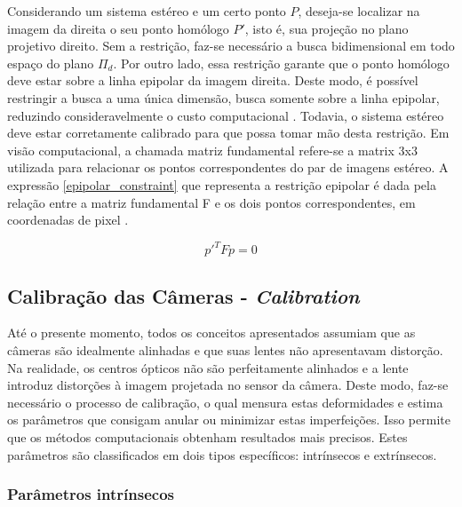 Considerando um sistema estéreo e um certo ponto $P$, deseja-se localizar na imagem da direita o seu ponto homólogo $P'$, isto é, sua projeção no plano projetivo direito. Sem a restrição, faz-se necessário a busca bidimensional em todo espaço do plano $\Pi_d$. Por outro lado, essa restrição garante que o ponto homólogo deve estar sobre a linha epipolar da imagem direita. Deste modo, é possível restringir a busca a uma única dimensão, busca somente sobre a linha epipolar, reduzindo consideravelmente o custo computacional \cite{Bradski2008}. Todavia, o sistema estéreo deve estar corretamente calibrado para que possa tomar mão desta restrição. Em visão computacional, a chamada matriz fundamental refere-se a matrix 3x3 utilizada para relacionar os pontos correspondentes do par de imagens estéreo. A expressão \ref{epipolar_constraint} que representa a restrição epipolar é dada pela relação entre a matriz fundamental F e os dois pontos correspondentes, em coordenadas de pixel \cite{RobertLaganiere}.

\begin{equation}
 \label{epipolar_constraint}
 p'^TFp = 0
\end{equation}


\subsection{Calibração das Câmeras - \textit{Calibration}}
\label{theory_calib}

Até o presente momento, todos os conceitos apresentados assumiam que as câmeras são idealmente alinhadas e que suas lentes não apresentavam distorção. Na realidade, os centros ópticos não são perfeitamente alinhados e a lente introduz distorções à imagem projetada no sensor da câmera. Deste modo, faz-se necessário o processo de calibração, o qual mensura estas deformidades e estima os parâmetros que consigam anular ou minimizar estas imperfeições. Isso permite que os métodos computacionais obtenham resultados mais precisos. Estes parâmetros são classificados em dois tipos específicos: intrínsecos e extrínsecos.


\subsubsection{Parâmetros intrínsecos}

